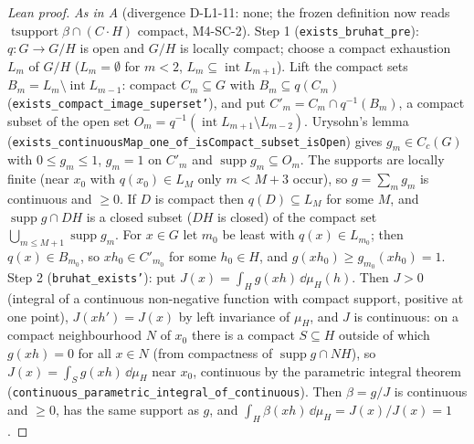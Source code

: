\begin{proof}[Lean proof]
\emph{As in A} (divergence D-L1-11: none; the frozen definition now reads $\operatorname{tsupport}\beta\cap(C\cdot H)$ compact, M4-SC-2). Step 1 (\texttt{exists\_bruhat\_pre}): $q\colon G\to G/H$ is open and $G/H$ is locally compact; choose a compact exhaustion $L_m$ of $G/H$ ($L_m=\emptyset$ for $m<2$, $L_m\subseteq\operatorname{int}L_{m+1}$). Lift the compact sets $B_m=L_m\setminus\operatorname{int}L_{m-1}$: compact $C_m\subseteq G$ with $B_m\subseteq q(C_m)$ (\texttt{exists\_compact\_image\_superset'}), and put $C'_m=C_m\cap q^{-1}(B_m)$, a compact subset of the open set $O_m=q^{-1}(\operatorname{int}L_{m+1}\setminus L_{m-2})$. Urysohn's lemma (\texttt{exists\_continuousMap\_one\_of\_isCompact\_subset\_isOpen}) gives $g_m\in C_c(G)$ with $0\le g_m\le1$, $g_m=1$ on $C'_m$ and $\operatorname{supp}g_m\subseteq O_m$. The supports are locally finite (near $x_0$ with $q(x_0)\in L_M$ only $m<M+3$ occur), so $g=\sum_mg_m$ is continuous and $\ge0$. If $D$ is compact then $q(D)\subseteq L_M$ for some $M$, and $\operatorname{supp}g\cap DH$ is a closed subset ($DH$ is closed) of the compact set $\bigcup_{m\le M+1}\operatorname{supp}g_m$. For $x\in G$ let $m_0$ be least with $q(x)\in L_{m_0}$; then $q(x)\in B_{m_0}$, so $xh_0\in C'_{m_0}$ for some $h_0\in H$, and $g(xh_0)\ge g_{m_0}(xh_0)=1$. Step 2 (\texttt{bruhat\_exists'}): put $J(x)=\int_Hg(xh)\,\dd\mu_H(h)$. Then $J>0$ (integral of a continuous non-negative function with compact support, positive at one point), $J(xh')=J(x)$ by left invariance of $\mu_H$, and $J$ is continuous: on a compact neighbourhood $N$ of $x_0$ there is a compact $S\subseteq H$ outside of which $g(xh)=0$ for all $x\in N$ (from compactness of $\operatorname{supp}g\cap NH$), so $J(x)=\int_Sg(xh)\,\dd\mu_H$ near $x_0$, continuous by the parametric integral theorem (\texttt{continuous\_parametric\_integral\_of\_continuous}). Then $\beta=g/J$ is continuous and $\ge0$, has the same support as $g$, and $\int_H\beta(xh)\,\dd\mu_H=J(x)/J(x)=1$.
\end{proof}

